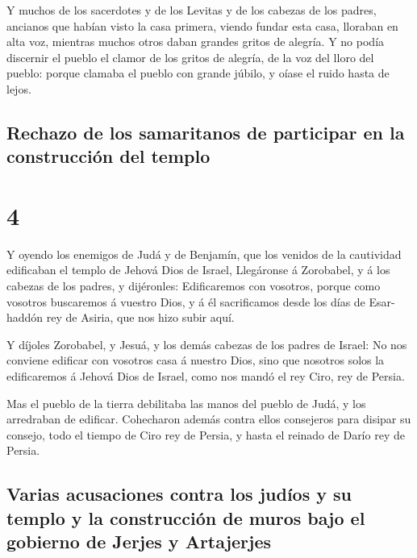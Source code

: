  Y muchos de los sacerdotes y de los Levitas y de los
cabezas de los padres, ancianos que habían visto la casa primera, viendo
fundar esta casa, lloraban en alta voz, mientras muchos otros daban
grandes gritos de alegría.  Y no podía discernir el
pueblo el clamor de los gritos de alegría, de la voz del lloro del
pueblo: porque clamaba el pueblo con grande júbilo, y oíase el ruido
hasta de lejos.

\hypertarget{rechazo-de-los-samaritanos-de-participar-en-la-construcciuxf3n-del-templo}{%
\subsection{Rechazo de los samaritanos de participar en la construcción
del
templo}\label{rechazo-de-los-samaritanos-de-participar-en-la-construcciuxf3n-del-templo}}

\hypertarget{section-15-4}{%
\section{4}\label{section-15-4}}

 Y oyendo los enemigos de Judá y de Benjamín, que los
venidos de la cautividad edificaban el templo de Jehová Dios de Israel,
 Llegáronse á Zorobabel, y á los cabezas de los padres, y
dijéronles: Edificaremos con vosotros, porque como vosotros buscaremos á
vuestro Dios, y á él sacrificamos desde los días de Esar-haddón rey de
Asiria, que nos hizo subir aquí.

 Y díjoles Zorobabel, y Jesuá, y los demás cabezas de los
padres de Israel: No nos conviene edificar con vosotros casa á nuestro
Dios, sino que nosotros solos la edificaremos á Jehová Dios de Israel,
como nos mandó el rey Ciro, rey de Persia.

 Mas el pueblo de la tierra debilitaba las manos del
pueblo de Judá, y los arredraban de edificar.  Cohecharon
además contra ellos consejeros para disipar su consejo, todo el tiempo
de Ciro rey de Persia, y hasta el reinado de Darío rey de Persia.

\hypertarget{varias-acusaciones-contra-los-juduxedos-y-su-templo-y-la-construcciuxf3n-de-muros-bajo-el-gobierno-de-jerjes-y-artajerjes}{%
\subsection{Varias acusaciones contra los judíos y su templo y la
construcción de muros bajo el gobierno de Jerjes y
Artajerjes}\label{varias-acusaciones-contra-los-juduxedos-y-su-templo-y-la-construcciuxf3n-de-muros-bajo-el-gobierno-de-jerjes-y-artajerjes}}

